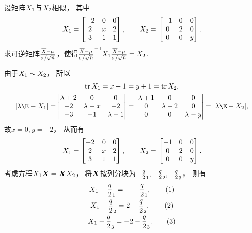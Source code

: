 \begin{example}
设矩阵\(X_1\)与\(X_2\)相似，
其中\begin{equation*}
	X_1 = \begin{bmatrix}
		-2 & 0 & 0 \\
		2 & x & 2 \\
		3 & 1 & 1
	\end{bmatrix},
	\qquad
	X_2 = \begin{bmatrix}
		-1 & 0 & 0 \\
		0 & 2 & 0 \\
		0 & 0 & y
	\end{bmatrix}.
\end{equation*}
求可逆矩阵\(\P\)，使得\(\P^{-1} \A \P = \B\).
\begin{solution}
由于\(X_1 \sim X_2\)，
所以\begin{gather*}
	\tr\A = x - 1 = y + 1 = \tr\B, \\
	\abs{\lambda\E-\A}
	= \begin{vmatrix}
		\lambda+2 & 0 & 0 \\
		-2 & \lambda-x & -2 \\
		-3 & -1 & \lambda-1
	\end{vmatrix}
	= \begin{vmatrix}
		\lambda+1 & 0 & 0 \\
		0 & \lambda-2 & 0 \\
		0 & 0 & \lambda-y
	\end{vmatrix}
	= \abs{\lambda\E-\B},
\end{gather*}
故\(x = 0,
y = -2\)，
从而有\begin{equation*}
	X_1 = \begin{bmatrix}
		-2 & 0 & 0 \\
		2 & x & 2 \\
		3 & 1 & 1
	\end{bmatrix},
	\qquad
	X_2 = \begin{bmatrix}
		-1 & 0 & 0 \\
		0 & 2 & 0 \\
		0 & 0 & y
	\end{bmatrix}.
\end{equation*}
考虑方程\(X_1 \boldsymbol{X} = \boldsymbol{X} X_2\)，
将\(\boldsymbol{X}\)按列分块为\(-\frac{q}{2}_1,-\frac{q}{2}_2,-\frac{q}{2}_3\)，
则有\begin{gather*}
	\A \a_1 = -\a_1, \tag1 \\
	\A \a_2 = 2\a_2, \tag2 \\
	\A \a_3 = -2\a_3. \tag3
\end{gather*}


\end{solution}
\end{example}
